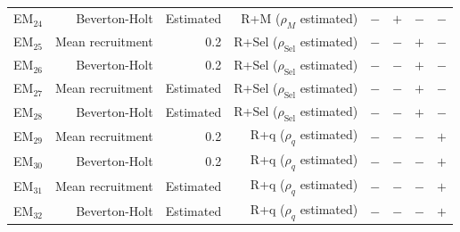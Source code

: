 \documentclass[
  12pt,
]{article}
\providecommand{\DIFdelbegin}{} %
\newcommand{\DIFscaledelfig}{0.5}
\newlength{\DIFdelgraphicswidth} %
\newlength{\DIFdelgraphicsheight} %
\newcommand{\DIFdelincludegraphics}[2][]{%
\sbox{\DIFdelgraphicsbox}{\DIFOincludegraphics[#1]{#2}}%
\settoboxwidth{\DIFdelgraphicswidth}{\DIFdelgraphicsbox} %
\settoboxtotalheight{\DIFdelgraphicsheight}{\DIFdelgraphicsbox} %
\scalebox{\DIFscaledelfig}{%
\parbox[b]{\DIFdelgraphicswidth}{\usebox{\DIFdelgraphicsbox}\\[-\baselineskip] \rule{\DIFdelgraphicswidth}{0em}}\llap{\resizebox{\DIFdelgraphicswidth}{\DIFdelgraphicsheight}{%
\setlength{\unitlength}{\DIFdelgraphicswidth}%
\begin{picture}(1,1)%
\thicklines\linethickness{2pt} %
{\color[rgb]{1,0,0}\put(0,0){\framebox(1,1){}}}%
{\color[rgb]{1,0,0}\put(0,0){\line( 1,1){1}}}%
{\color[rgb]{1,0,0}\put(0,1){\line(1,-1){1}}}%
\end{picture}%
}\hspace*{3pt}}} %
} %
\DeclareRobustCommand{\DIFdelbegin}{\DIFOdelbegin \let\includegraphics\DIFdelincludegraphics} %
\begin{document}
\begin{table}
{\begin{center}
\begin{tabular}{rrrrrrrr}
EM$_{24}$&Beverton-Holt&Estimated&R+M ($\rho_{M}$ estimated)&$-$&$+$&$-$&$-$\tabularnewline
EM$_{25}$&Mean recruitment&0.2&R+Sel ($\rho_{\text{Sel}}$ estimated)&$-$&$-$&$+$&$-$\tabularnewline
EM$_{26}$&Beverton-Holt&0.2&R+Sel ($\rho_{\text{Sel}}$ estimated)&$-$&$-$&$+$&$-$\tabularnewline
EM$_{27}$&Mean recruitment&Estimated&R+Sel ($\rho_{\text{Sel}}$ estimated)&$-$&$-$&$+$&$-$\tabularnewline
EM$_{28}$&Beverton-Holt&Estimated&R+Sel ($\rho_{\text{Sel}}$ estimated)&$-$&$-$&$+$&$-$\tabularnewline
EM$_{29}$&Mean recruitment&0.2&R+q ($\rho_{q}$ estimated)&$-$&$-$&$-$&$+$\tabularnewline
EM$_{30}$&Beverton-Holt&0.2&R+q ($\rho_{q}$ estimated)&$-$&$-$&$-$&$+$\tabularnewline
EM$_{31}$&Mean recruitment&Estimated&R+q ($\rho_{q}$ estimated)&$-$&$-$&$-$&$+$\tabularnewline
EM$_{32}$&Beverton-Holt&Estimated&R+q ($\rho_{q}$ estimated)&$-$&$-$&$-$&$+$\tabularnewline
\hline
\end{tabular}\end{center}
}
\end{table}

\DIFdelbegin %
\end{document}
